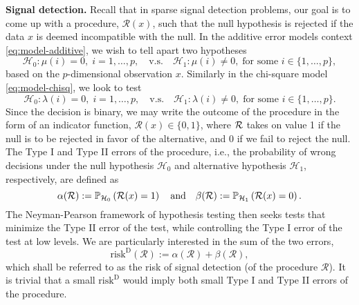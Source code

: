 {\bf Signal detection.} 
Recall that in sparse signal detection problems, our goal is to come up with a procedure, $\mathcal{R}(x)$, such that the null hypothesis is rejected if the data $x$ is deemed incompatible with the null.
In the additive error models context \eqref{eq:model-additive}, we wish to tell apart two hypotheses
\begin{equation} \label{eq:global-test-additive}
    \mathcal{H}_0: \mu(i) = 0, \;i=1,\ldots,p,
    \quad\text{v.s.}\quad 
    \mathcal{H}_1: \mu(i)\neq 0, \; \text{for some }i\in\{1,\ldots,p\},
\end{equation}
based on the $p$-dimensional observation $x$.
Similarly in the chi-square model \eqref{eq:model-chisq}, we look to test
\begin{equation} \label{eq:global-test-chisq}
    \mathcal{H}_0: \lambda(i) = 0, \;i=1,\ldots,p,
    \quad\text{v.s.}\quad 
    \mathcal{H}_1: \lambda(i)\neq 0, \; \text{for some }i\in\{1,\ldots,p\}.
\end{equation} 
Since the decision is binary, we may write the outcome of the procedure in the form of an indicator function, 
$\mathcal{R}(x)\in\{0,1\}$, where ${\cal R}$ takes on value 1 if the null is to be rejected in favor of the alternative, 
and 0 if we fail to reject the null. 
The Type I and Type II errors of the procedure, i.e., the probability of wrong decisions under the null hypothesis $\mathcal{H}_0$ and alternative hypothesis $\mathcal{H}_1$, respectively, are defined as 
\begin{equation} \label{eq:type-II-error}
    \alpha(\mathcal{R}) := \P_{\mathcal{H}_0}\left(\mathcal{R}(x)=1\right)
    \quad \text{and} \quad
    \beta(\mathcal{R}) := \P_{\mathcal{H}_1}\left(\mathcal{R}(x)=0\right).
\end{equation}
The Neyman-Pearson framework of hypothesis testing then seeks tests that minimize the Type II error of the test, while controlling the Type I error of the test at low levels.
We are particularly interested in the sum of the two errors, 
\begin{equation} \label{eq:risk-detection}
    \mathrm{risk}^{\mathrm{D}}(\mathcal{R}) := \alpha(\mathcal{R}) + \beta(\mathcal{R}),
\end{equation}
which shall be referred to as the risk of signal detection (of the procedure $\mathcal{R}$).
It is trivial that a small $\mathrm{risk}^{\mathrm{D}}$ would imply both small Type I and Type II errors of the procedure.

\medskip

